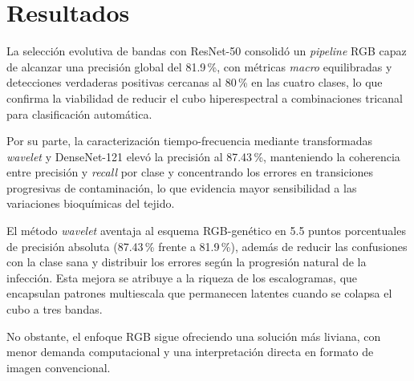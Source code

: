 \chapter{Resultados}

La selección evolutiva de bandas con ResNet-50 consolidó un \textit{pipeline} RGB capaz de alcanzar una precisión global del 81.9\,\%, con métricas \textit{macro} equilibradas y detecciones verdaderas positivas cercanas al 80\,\% en las cuatro clases, lo que confirma la viabilidad de reducir el cubo hiperespectral a combinaciones tricanal para clasificación automática.

\vspace{5mm}

Por su parte, la caracterización tiempo-frecuencia mediante transformadas \textit{wavelet} y DenseNet-121 elevó la precisión al 87.43\,\%, manteniendo la coherencia entre precisión y \textit{recall} por clase y concentrando los errores en transiciones progresivas de contaminación, lo que evidencia mayor sensibilidad a las variaciones bioquímicas del tejido.

\vspace{5mm}

El método \textit{wavelet} aventaja al esquema RGB-genético en 5.5 puntos porcentuales de precisión absoluta (87.43\,\% frente a 81.9\,\%), además de reducir las confusiones con la clase sana y distribuir los errores según la progresión natural de la infección. Esta mejora se atribuye a la riqueza de los escalogramas, que encapsulan patrones multiescala que permanecen latentes cuando se colapsa el cubo a tres bandas. 

\vspace{5mm}

No obstante, el enfoque RGB sigue ofreciendo una solución más liviana, con menor demanda computacional y una interpretación directa en formato de imagen convencional.
